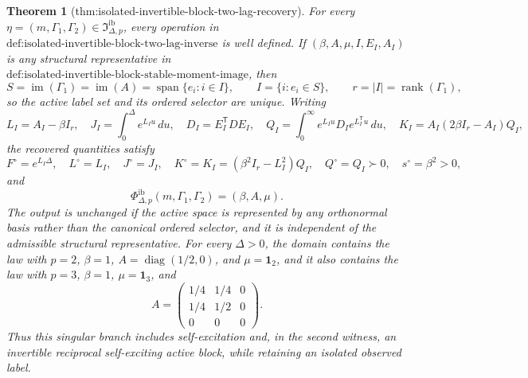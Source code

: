 \documentclass{article}
\newtheorem{theorem}{Theorem}
\begin{document}
\begin{theorem}[thm:isolated-invertible-block-two-lag-recovery]\label{thm:isolated-invertible-block-two-lag-recovery}
For every \(\eta=(m,\Gamma_1,\Gamma_2)\in\mathfrak I_{\Delta,p}^{\mathrm{ib}}\), every operation in \(\text{def:isolated-invertible-block-two-lag-inverse}\) is well defined.  If \((\beta,A,\mu,I,E_I,A_I)\) is any structural representative in \(\text{def:isolated-invertible-block-stable-moment-image}\), then
\[
 S=\operatorname{im}(\Gamma_1)=\operatorname{im}(A)
   =\operatorname{span}\{e_i:i\in I\},\qquad
 I=\{i:e_i\in S\},\qquad r=|I|=\operatorname{rank}(\Gamma_1),
\]
so the active label set and its ordered selector are unique.  Writing
\[
 L_I=A_I-\beta I_r,\quad
 J_I=\int_0^\Delta e^{L_Iu}\,du,\quad
 D_I=E_I^{\mathsf T}DE_I,\quad
 Q_I=\int_0^\infty e^{L_Iu}D_Ie^{L_I^{\mathsf T}u}\,du,\quad
 K_I=A_I(2\beta I_r-A_I)Q_I,
\]
the recovered quantities satisfy
\[
 F^\circ=e^{L_I\Delta},\quad L^\circ=L_I,\quad J^\circ=J_I,\quad
 K^\circ=K_I=(\beta^2I_r-L_I^2)Q_I,\quad Q^\circ=Q_I\succ0,\quad s^\circ=\beta^2>0,
\]
and
\[
 \Phi_{\Delta,p}^{\mathrm{ib}}(m,\Gamma_1,\Gamma_2)=(\beta,A,\mu).
\]
The output is unchanged if the active space is represented by any orthonormal basis rather than the canonical ordered selector, and it is independent of the admissible structural representative.  For every \(\Delta>0\), the domain contains the law with \(p=2\), \(\beta=1\), \(A=\operatorname{diag}(1/2,0)\), and \(\mu=\mathbf 1_2\), and it also contains the law with \(p=3\), \(\beta=1\), \(\mu=\mathbf 1_3\), and
\[
 A=\begin{pmatrix}1/4&1/4&0\\1/4&1/2&0\\0&0&0\end{pmatrix}.
\]
Thus this singular branch includes self-excitation and, in the second witness, an invertible reciprocal self-exciting active block, while retaining an isolated observed label.
\end{theorem}
\end{document}
